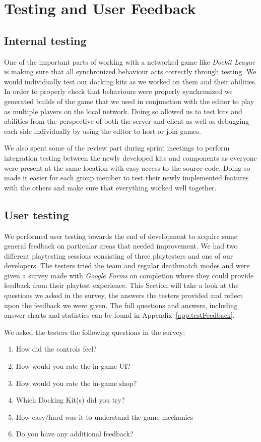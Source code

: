 \chapter{Testing and User Feedback}
\label{chap:testing}

\section{Internal testing}
One of the important parts of working with a networked game like \emph{Dockit League} is making sure that all synchronized behaviour acts correctly through testing. We would individually test our docking kits as we worked on them and their abilities. In order to properly check that behaviours were properly synchronized we generated builds of the game that we used in conjunction with the editor to play as multiple players on the local network. Doing so allowed us to test kits and abilities from the perspective of both the server and client as well as debugging each side individually by using the editor to host or join games.

We also spent some of the review part during sprint meetings to perform integration testing between the newly developed kits and components as everyone were present at the same location with easy access to the source code. Doing so made it easier for each group member to test their newly implemented features with the others and make sure that everything worked well together. 


\section{User testing}
We performed user testing towards the end of development to acquire some general feedback on particular areas that needed improvement. We had two different playtesting sessions consisting of three playtesters and one of our developers. The testers tried the team and regular deathmatch modes and were given a survey made with \emph{Google Forms} on completion where they could provide feedback from their playtest experience. This Section will take a look at the questions we asked in the survey, the answers the testers provided and reflect upon the feedback we were given. The full questions and answers, including answer charts and statistics can be found in Appendix~\ref{app:testFeedback}.

We asked the testers the following questions in the survey:
\begin{enumerate}
    \item How did the controls feel?
    \item How would you rate the in-game UI?
    \item How would you rate the in-game shop?
    \item Which Docking Kit(s) did you try?
    \item How easy/hard was it to understand the game mechanics
    \item Do you have any additional feedback?
\end{enumerate}
 
